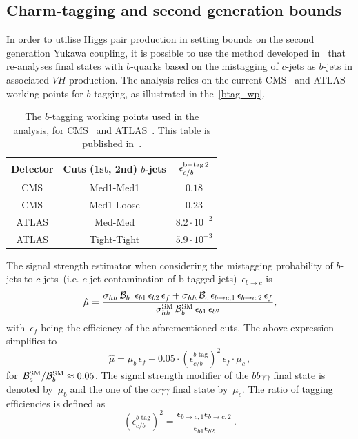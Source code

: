 \subsection{Charm-tagging and second generation bounds}
  \par In order to utilise Higgs pair production in setting bounds on the second generation Yukawa coupling, it is possible to use the method developed in~\cite{Perez:2015aoa,Kim:2015oua} that re-analyses final states with $b$-quarks based on the mistagging of $c$-jets as $b$-jets in associated $VH$ production. The analysis relies on the current CMS~\cite{Chatrchyan:2013zna} and ATLAS~\cite{Aad:2014xzb} working points for $b$-tagging, as illustrated in the~\autoref{btag_wp}.
\begin{table}
	\centering
	\begin{tabular}{ccc}
		\toprule
		Detector	& Cuts (1st, 2nd) $b$-jets	& $\epsilon_{c/b}^{\rm{b-tag}\,2}$  \\
		\midrule
		CMS    & Med1-Med1   & $0.18$               \\
		CMS    & Med1-Loose  & $0.23$                \\
		\hline
		ATLAS  & Med-Med     & $8.2 \cdot 10^{-2}$ \\
		ATLAS  & Tight-Tight & $5.9 \cdot 10^{-3}$ \\
		\bottomrule
	\end{tabular}
	\caption{The $b$-tagging working points used in the analysis, for CMS~\cite{Chatrchyan:2013zna} and ATLAS~\cite{Aad:2014xzb}. This table is published in~\cite{Alasfar:2019pmn}. }
	\label{btag_wp}
\end{table}
The signal strength estimator when considering the mistagging probability  of $b$-jets to $c$-jets~(i.e. $c$-jet contamination of b-tagged jets)~$\epsilon_{b\to c}$ is
\begin{equation}
	\hat \mu = \frac{\sigma_{hh}\, \mathcal B_b\ \,\epsilon_{b1}\,\epsilon_{b2} \,\epsilon_f+\sigma_{hh}\, \mathcal B_c \,\epsilon_{b\to c,1} \,\epsilon_{b\to c,2}\,\epsilon_f }{\sigma_{hh}^{\mathrm{SM}}\, \mathcal B_b^{\mathrm{SM}}\,  \epsilon_{b1}\,\epsilon_{b2}},
\end{equation}
with~$\epsilon_f$ being the efficiency of the  aforementioned cuts. The above expression simplifies to
\begin{equation}
	\hat \mu = \mu_b\,\epsilon_f +0.05\cdot \left(\epsilon_{c/b}^{\text{$b$-tag}}\right)^2 \, \epsilon_f \cdot  \mu_c\,,
	\label{cmistag}
\end{equation}
for~$ \mathcal B_c^{\mathrm{SM}} / \mathcal B_b^{\mathrm{SM}} \approx 0.05$. The signal strength modifier of the $b\bar{b}\gamma\gamma$ final state is denoted by~$\mu_b$ and the one of the  $c\bar{c}\gamma\gamma$ final state by~$\mu_c$. 
The ratio of tagging efficiencies is defined as
\begin{equation}
	\left( \epsilon_{c/b}^{\text{$b$-tag}}\right)^2 = \frac{\epsilon_{b\to c,1}  \epsilon_{b\to c,2} }{\epsilon_{b1} \epsilon_{b2}}\,.
\end{equation}

